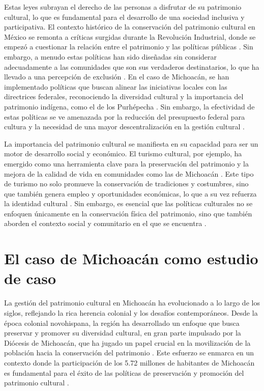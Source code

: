 \documentclass[
  spanish,
  11pt,
  a4paper,
]{scrbook}
\begin{document}
Estas leyes subrayan el derecho de las personas a disfrutar de su
patrimonio cultural, lo que es fundamental para el desarrollo de una
sociedad inclusiva y participativa. El contexto histórico de la
conservación del patrimonio cultural en México se remonta a críticas
surgidas durante la Revolución Industrial, donde se empezó a cuestionar
la relación entre el patrimonio y las políticas públicas
\autocite{Cantar2021}. Sin embargo, a menudo estas políticas han sido
diseñadas sin considerar adecuadamente a las comunidades que son sus
verdaderos destinatarios, lo que ha llevado a una percepción de
exclusión \autocite{Garcia2021a}. En el caso de Michoacán, se han
implementado políticas que buscan alinear las iniciativas locales con
las directrices federales, reconociendo la diversidad cultural y la
importancia del patrimonio indígena, como el de los
P\textquotesingle urhépecha \autocite{Azevedo2020}. Sin embargo, la
efectividad de estas políticas se ve amenazada por la reducción del
presupuesto federal para cultura y la necesidad de una mayor
descentralización en la gestión cultural \autocite{Arteaga2016}.

La importancia del patrimonio cultural se manifiesta en su capacidad
para ser un motor de desarrollo social y económico. El turismo cultural,
por ejemplo, ha emergido como una herramienta clave para la preservación
del patrimonio y la mejora de la calidad de vida en comunidades como las
de Michoacán \autocite{Moreno2023}. Este tipo de turismo no solo
promueve la conservación de tradiciones y costumbres, sino que también
genera empleo y oportunidades económicas, lo que a su vez refuerza la
identidad cultural \autocite{CantuMartinez2018,BecerraMoreno2023}. Sin
embargo, es esencial que las políticas culturales no se enfoquen
únicamente en la conservación física del patrimonio, sino que también
aborden el contexto social y comunitario en el que se encuentra
\autocite{Arteaga2016}.

\section*{El caso de Michoacán como estudio de
caso}\label{el-caso-de-michoacuxe1n-como-estudio-de-caso}


La gestión del patrimonio cultural en Michoacán ha evolucionado a lo
largo de los siglos, reflejando la rica herencia colonial y los desafíos
contemporáneos. Desde la época colonial novohispana, la región ha
desarrollado un enfoque que busca preservar y promover su diversidad
cultural, en gran parte impulsado por la Diócesis de Michoacán, que ha
jugado un papel crucial en la movilización de la población hacia la
conservación del patrimonio \autocite{Moreno2023}. Este esfuerzo se
enmarca en un contexto donde la participación de los 5.72 millones de
habitantes de Michoacán es fundamental para el éxito de las políticas de
preservación y promoción del patrimonio cultural \autocite{Moreno2023}.
\end{document}
